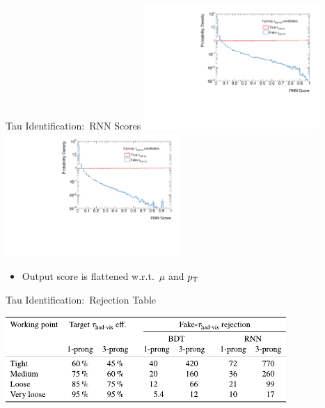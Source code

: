 \documentclass[11pt, xcolor={dvipsnames}, aspectratio=169, notes]{beamer}
\begin{document}

\begin{frame}{Tau Identification:\ RNN Scores}
  \includegraphics[width=0.5\textwidth]{tauid/rnnscore_1p}%
  \includegraphics[width=0.5\textwidth]{tauid/rnnscore_3p}

  \begin{itemize}
  \item Output score is flattened w.r.t.\ $\mu$ and \tauhadvis $p_{\text{T}}$
  \end{itemize}
\end{frame}


\begin{frame}{Tau Identification:\ Rejection Table}
  \centering

  \includegraphics[width=0.8\textwidth]{backup/tauid_rejection}
\end{frame}

\end{document}
